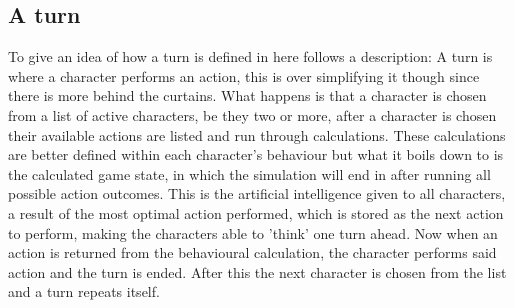 \subsection{A turn}
To give an idea of how a turn is defined in \langname{} here follows a description:
A turn is where a character performs an action, this is over simplifying it though since there is more behind the curtains.
What happens is that a character is chosen from a list of active characters, be they two or more, after a character is chosen their available actions are listed and run through calculations. These calculations are better defined within each character's behaviour but what it boils down to is the calculated game state, in which the simulation will end in after running all possible action outcomes. This is the artificial intelligence given to all characters, a result of the most optimal action performed, which is stored as the next action to perform, making the characters able to 'think' one turn ahead.
Now when an action is returned from the behavioural calculation, the character performs said action and the turn is ended.
After this the next character is chosen from the list and a turn repeats itself.